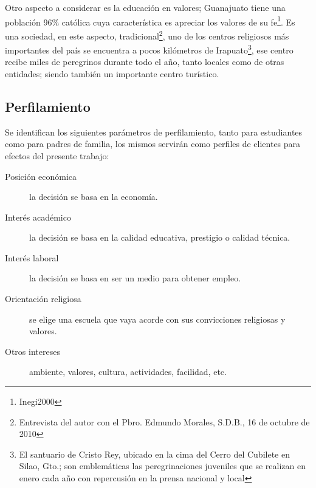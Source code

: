 Otro aspecto a considerar es la educación en valores; Guanajuato tiene una población 96\% católica cuya característica es apreciar los valores de su fe\footnote{Inegi2000}. Es una sociedad, en este aspecto, tradicional\footnote{Entrevista del autor con el Pbro. Edmundo Morales, S.D.B., 16 de octubre de 2010}, uno de los centros religiosos más importantes del país se encuentra a pocos kilómetros de Irapuato\footnote{El santuario de Cristo Rey, ubicado en la cima del Cerro del Cubilete en Silao, Gto.; son emblemáticas las peregrinaciones juveniles que se realizan en enero cada año con repercusión en la prensa nacional y local}, ese centro recibe miles de peregrinos durante todo el año, tanto locales como de otras entidades; siendo también un importante centro turístico.

%

\subsection{Perfilamiento}

Se identifican los siguientes parámetros de perfilamiento, tanto para estudiantes como para padres de familia, los mismos servirán como perfiles de clientes para efectos del presente trabajo:

\begin{description}
	\item [Posición económica] la decisión se basa en la economía.
	\item [Interés académico] la decisión se basa en la calidad educativa, prestigio o calidad técnica.
	\item [Interés laboral] la decisión se basa en ser un medio para obtener empleo.
	\item [Orientación religiosa] se elige una escuela que vaya acorde con sus convicciones religiosas y valores.
	\item [Otros intereses] ambiente, valores, cultura, actividades, facilidad, etc.
\end{description}

